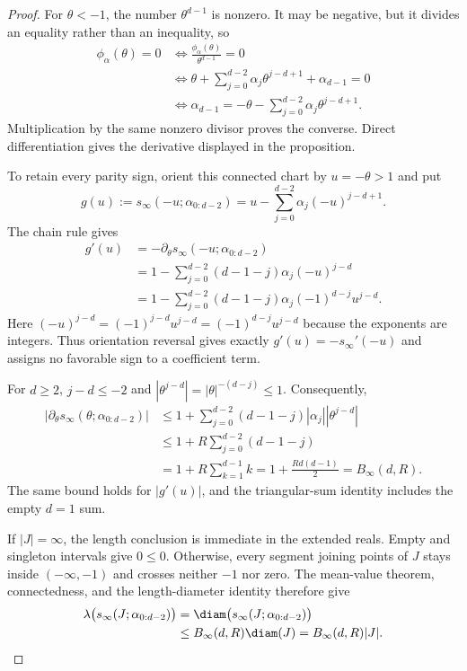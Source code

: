 \begin{proof}
For $\theta<-1$, the number $\theta^{d-1}$ is nonzero.  It may be negative,
but it divides an equality rather than an inequality, so
\[
\begin{aligned}
\phi_\alpha(\theta)=0
&\Longleftrightarrow \frac{\phi_\alpha(\theta)}{\theta^{d-1}}=0\\
&\Longleftrightarrow
\theta+\sum_{j=0}^{d-2}\alpha_j\theta^{j-d+1}
+\alpha_{d-1}=0\\
&\Longleftrightarrow
\alpha_{d-1}=-\theta-\sum_{j=0}^{d-2}\alpha_j\theta^{j-d+1}.
\end{aligned}
\]
Multiplication by the same nonzero divisor proves the converse.  Direct
differentiation gives the derivative displayed in the proposition.

To retain every parity sign, orient this connected chart by $u=-\theta>1$
and put
\[
g(u):=s_\infty(-u;\alpha_{0:d-2})
=u-\sum_{j=0}^{d-2}\alpha_j(-u)^{j-d+1}.
\]
The chain rule gives
\[
\begin{aligned}
g'(u)
&=-\partial_\theta s_\infty(-u;\alpha_{0:d-2})\\
&=1-\sum_{j=0}^{d-2}(d-1-j)\alpha_j(-u)^{j-d}\\
&=1-\sum_{j=0}^{d-2}(d-1-j)\alpha_j
(-1)^{d-j}u^{j-d}.
\end{aligned}
\]
Here $(-u)^{j-d}=(-1)^{j-d}u^{j-d}=(-1)^{d-j}u^{j-d}$ because the exponents
are integers.  Thus orientation reversal gives exactly
$g'(u)=-s_\infty'(-u)$ and assigns no favorable sign to a coefficient term.

For $d\geq2$, $j-d\leq-2$ and
$|\theta^{j-d}|=|\theta|^{-(d-j)}\leq1$.  Consequently,
\[
\begin{aligned}
|\partial_\theta s_\infty(\theta;\alpha_{0:d-2})|
&\leq1+\sum_{j=0}^{d-2}(d-1-j)|\alpha_j||\theta^{j-d}|\\
&\leq1+R\sum_{j=0}^{d-2}(d-1-j)\\
&=1+R\sum_{k=1}^{d-1}k
=1+\frac{Rd(d-1)}2=B_\infty(d,R).
\end{aligned}
\]
The same bound holds for $|g'(u)|$, and the triangular-sum identity includes
the empty $d=1$ sum.

If $|J|=\infty$, the length conclusion is immediate in the extended reals.
Empty and singleton intervals give $0\leq0$.  Otherwise, every segment
joining points of $J$ stays inside $(-\infty,-1)$ and crosses neither $-1$
nor zero.  The mean-value theorem, connectedness, and the length-diameter
identity therefore give
\[
\begin{aligned}
\lambda\bigl(s_\infty(J;\alpha_{0:d-2})\bigr)
&=\diam\bigl(s_\infty(J;\alpha_{0:d-2})\bigr)\\
&\leq B_\infty(d,R)\diam(J)
=B_\infty(d,R)|J|.
\end{aligned}
\]


\end{proof}
